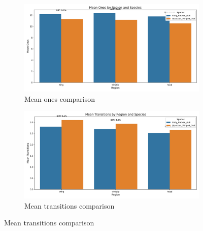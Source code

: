 \documentclass[a4paper,12pt]{report}
\begin{document}
\begin{figure}[H]
    \begin{subfigure}[t]{0.48\textwidth}
        \centering
        \includegraphics[width=\textwidth]{images/appendix/Original/mean_ones_comparison.png}
        \caption{Mean ones comparison}
    \end{subfigure}
    \hfill
    \begin{subfigure}[t]{0.48\textwidth}
        \centering
        \includegraphics[width=\textwidth]{images/appendix/Original/mean_transitions_comparison.png}
        \caption{Mean transitions comparison}
    \end{subfigure}
    
    \vspace{0.5cm}
    

\end{figure}
\end{document}
